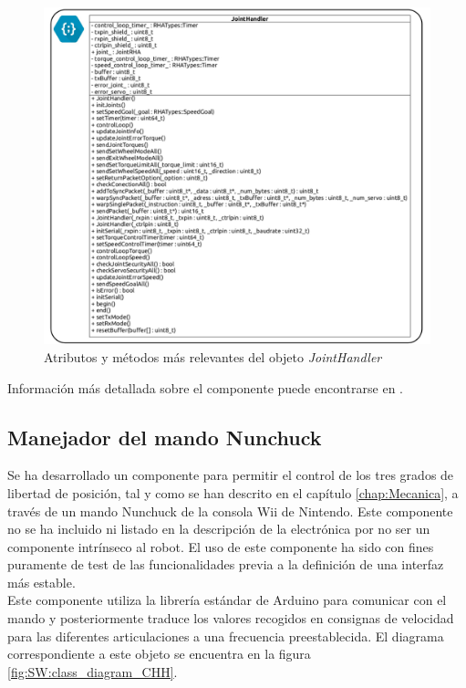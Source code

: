         \begin{figure}[H]
            \centering
            \includegraphics[width=1\textwidth]{figuras/Imagenes_SW/class_diagram_JH.jpg}
            \caption{Atributos y métodos más relevantes del objeto \textit{JointHandler}}
            \label{fig:SW:class_diagram_JH}
        \end{figure}

        Información más detallada sobre el componente puede encontrarse en \cite{rha_doc}.
        
    \subsection{Manejador del mando Nunchuck} \label{subsec:SW:chuck_handler}
        Se ha desarrollado un componente para permitir el control de los tres grados de libertad de posición, tal y como se han descrito en el capítulo \ref{chap:Mecanica}, a través de un mando Nunchuck de la consola Wii de Nintendo. Este componente no se ha incluido ni listado en la descripción de la electrónica por no ser un componente intrínseco al robot. El uso de este componente ha sido con fines puramente de test de las funcionalidades previa a la definición de una interfaz más estable.
        \\
        
        Este componente utiliza la librería  estándar de Arduino para comunicar con el mando y posteriormente traduce los valores recogidos en consignas de velocidad para las diferentes articulaciones a una frecuencia preestablecida. El diagrama correspondiente a este objeto se encuentra en la figura \ref{fig:SW:class_diagram_CHH}.

